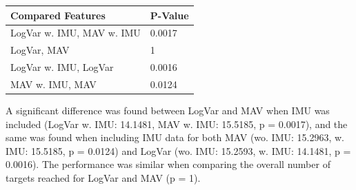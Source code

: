 		
\begin{center}
	\begin{tabular}{l l}
		\toprule
		\textbf{Compared Features} & \textbf{P-Value}\\
		\midrule
		LogVar w. IMU, MAV w. IMU & 0.0017 \\
		LogVar, MAV & 1 \\
		LogVar w. IMU, LogVar & 0.0016 \\
		MAV w. IMU, MAV & 0.0124 \\
		\bottomrule
	\end{tabular}
\end{center}

A significant difference was found between LogVar and MAV when IMU was included (LogVar w. IMU: 14.1481, MAV w. IMU: 15.5185, p = 0.0017), and the same was found when including IMU data for both MAV (wo. IMU: 15.2963, w. IMU: 15.5185, p = 0.0124) and LogVar (wo. IMU: 15.2593, w. IMU: 14.1481, p = 0.0016). The performance was similar when comparing the overall number of targets reached for LogVar and MAV (p = 1).